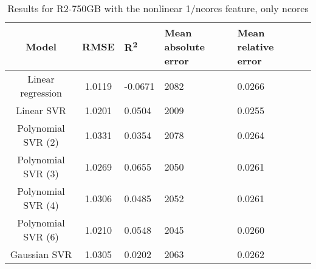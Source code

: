 \begin{table}[H]
\centering
\begin{adjustbox}{center}
\begin{tabular}{c | c M{1.2cm} M{2.5cm} M{2.5cm} M{1.8cm}}
Model & RMSE & R\textsuperscript{2} & Mean absolute error & Mean relative error \tabularnewline
\hline
Linear regression & 1.0119 & -0.0671 &   2082 & 0.0266 \\
Linear SVR & 1.0201 & 0.0504 &   2009 & 0.0255 \\
Polynomial SVR (2) & 1.0331 & 0.0354 &   2078 & 0.0264 \\
Polynomial SVR (3) & 1.0269 & 0.0655 &   2050 & 0.0261 \\
Polynomial SVR (4) & 1.0306 & 0.0485 &   2052 & 0.0261 \\
Polynomial SVR (6) & 1.0210 & 0.0548 &   2045 & 0.0260 \\
Gaussian SVR & 1.0305 & 0.0202 &   2063 & 0.0262 \\
\end{tabular}
\end{adjustbox}
\\
\caption{Results for R2-750GB with the nonlinear 1/ncores feature, only ncores}
\label{tab:all_nonlinear_R2_750}
\end{table}
